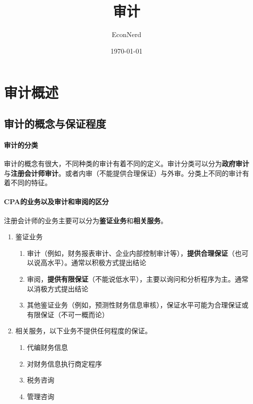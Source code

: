 \documentclass[UTF8,12pt]{ctexart}
\title{审计} %
\author{EconNerd}
\date{\today}
\numberwithin{equation}{section} %
\numberwithin{figure}{section}
\numberwithin{table}{section}
\begin{document}
	\maketitle
	\tableofcontents
	\newpage

	\section{审计概述}
	\subsection{审计的概念与保证程度}
	\paragraph{审计的分类}审计的概念有很大，不同种类的审计有着不同的定义。审计分类可以分为\textbf{政府审计}与\textbf{注册会计师审计}。或者内审（不能提供合理保证）与外审。分类上不同的审计有着不同的特征。
	
	\paragraph{CPA的业务以及审计和审阅的区分}注册会计师的业务主要可以分为\textbf{鉴证业务}和\textbf{相关服务}。
	\begin{enumerate}
		\item 鉴证业务
		\begin{enumerate}
			\item 审计（例如，财务报表审计、企业内部控制审计等），\textbf{提供合理保证}（也可以说高水平）。通常以积极方式提出结论
			
			\item 审阅，\textbf{提供有限保证}（不能说低水平），主要以询问和分析程序为主。通常以消极方式提出结论
			
			\item 其他鉴证业务（例如，预测性财务信息审核），保证水平可能为合理保证或有限保证（不可一概而论）
		\end{enumerate}
		
		\item 相关服务，以下业务不提供任何程度的保证。
		\begin{enumerate}
			\item 代编财务信息
			
			\item 对财务信息执行商定程序
			
			\item 税务咨询
			
			\item 管理咨询
		\end{enumerate}
	\end{enumerate}
	
\end{document}
